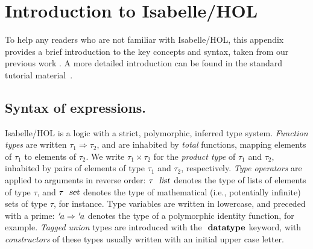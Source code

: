\section{Introduction to Isabelle/HOL}
\label{sect:appendix:isabelle}

To help any readers who are not familiar with Isabelle/HOL, this appendix provides a brief introduction to the key concepts and syntax, taken from our previous work \cite{Gomes:2017gy}.
A more detailed introduction can be found in the standard tutorial material~\cite{DBLP:books/sp/NipkowK14}.

\subsection{Syntax of expressions.}

Isabelle/HOL is a logic with a strict, polymorphic, inferred type system.
\emph{Function types} are written $\tau_1 \Rightarrow \tau_2$, and are inhabited by \emph{total} functions, mapping elements of $\tau_1$ to elements of $\tau_2$.
We write $\tau_1 \times \tau_2$ for the \emph{product type} of $\tau_1$ and $\tau_2$, inhabited by pairs of elements of type $\tau_1$ and $\tau_2$, respectively.
\emph{Type operators} are applied to arguments in reverse order: $\tau\ \isa{list}$ denotes the type of lists of elements of type $\tau$, and $\tau\ \isa{set}$ denotes the type of mathematical (i.e., potentially infinite) sets of type $\tau$, for instance.
Type variables are written in lowercase, and preceded with a prime: ${\emph{$\mskip2mu{'}\mskip-2mu$}}a \Rightarrow {\emph{$\mskip2mu{'}\mskip-2mu$}}a$ denotes the type of a polymorphic identity function, for example.
\emph{Tagged union} types are introduced with the $\isacommand{datatype}$ keyword, with \emph{constructors} of these types usually written with an initial upper case letter.

